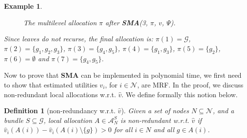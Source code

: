 \documentclass[]{article}
\newtheorem{definition}{Definition}
\newtheorem{example}{Example}
\newcommand{\nodes}{\mathcal{N}}
\newcommand{\items}{\mathcal{G}}
\newcommand{\allocations}{\mathcal{A}}
\begin{document}
\begin{example}
\begin{figure}[H]
    \caption{The multilevel allocation  $\pi$ after \textbf{SMA}(3, $\pi$, $v$, $\Psi$).}
    \label{fig: sma(3, pi)}
\end{figure}

Since leaves do not recurse, the final allocation is:  $\pi(1) = \items$, $\pi(2)  =  \{g_1, g_2, g_3\}$,  $\pi(3)  =  \{g_4, g_5\}$, $\pi(4) = \{g_1, g_3\}$, $\pi(5)  = \{g_2\}$, $\pi(6) = \emptyset$ and $\pi(7) = \{g_4, g_5\}$.

\end{example}

\noindent Now to prove that {\bf SMA} can be implemented in polynomial time, we first need to show that estimated utilities $\hat{v}_i$, for $i \in \nodes$, are MRF. In the proof, we discuss non-redundant local allocations w.r.t. $\hat{v}$. We define formally this notion below.

\begin{definition}[non-redundancy w.r.t. $\hat{v}$]
    Given a set of nodes $N \subseteq \nodes$, and a bundle $S \subseteq \items$, local allocation $A \in \allocations^S_N$ is non-redundant w.r.t. $\hat{v}$ if $\hat{v}_i(A(i)) - \hat{v}_i(A(i) \setminus \{g\}) > 0$ for all $i \in N$ and all $g \in A(i)$.
\end{definition}
\end{document}
